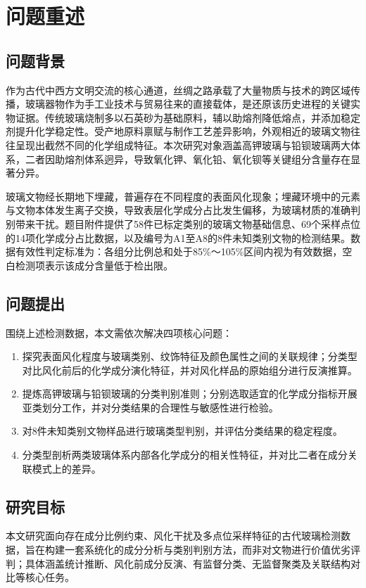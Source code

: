 \section{问题重述}

\subsection{问题背景}
作为古代中西方文明交流的核心通道，丝绸之路承载了大量物质与技术的跨区域传播，玻璃器物作为手工业技术与贸易往来的直接载体，是还原该历史进程的关键实物证据。传统玻璃烧制多以石英砂为基础原料，辅以助熔剂降低熔点，并添加稳定剂提升化学稳定性。受产地原料禀赋与制作工艺差异影响，外观相近的玻璃文物往往呈现出截然不同的化学组成特征。本次研究对象涵盖高钾玻璃与铅钡玻璃两大体系，二者因助熔剂体系迥异，导致氧化钾、氧化铅、氧化钡等关键组分含量存在显著分异。

玻璃文物经长期地下埋藏，普遍存在不同程度的表面风化现象；埋藏环境中的元素与文物本体发生离子交换，导致表层化学成分占比发生偏移，为玻璃材质的准确判别带来干扰。题目附件提供了58件已标定类别的玻璃文物基础信息、69个采样点位的14项化学成分占比数据，以及编号为A1至A8的8件未知类别文物的检测结果。数据有效性判定标准为：各组分比例总和处于85\%～105\%区间内视为有效数据，空白检测项表示该成分含量低于检出限。

\subsection{问题提出}
围绕上述检测数据，本文需依次解决四项核心问题：
\begin{enumerate}
  \item 探究表面风化程度与玻璃类别、纹饰特征及颜色属性之间的关联规律；分类型对比风化前后的化学成分演化特征，并对风化样品的原始组分进行反演推算。
  \item 提炼高钾玻璃与铅钡玻璃的分类判别准则；分别选取适宜的化学成分指标开展亚类划分工作，并对分类结果的合理性与敏感性进行检验。
  \item 对8件未知类别文物样品进行玻璃类型判别，并评估分类结果的稳定程度。
  \item 分类型剖析两类玻璃体系内部各化学成分的相关性特征，并对比二者在成分关联模式上的差异。
\end{enumerate}

\subsection{研究目标}
本文研究面向存在成分比例约束、风化干扰及多点位采样特征的古代玻璃检测数据，旨在构建一套系统化的成分分析与类别判别方法，而非对文物进行价值优劣评判；具体涵盖统计推断、风化前成分反演、有监督分类、无监督聚类及关联结构对比等核心任务。